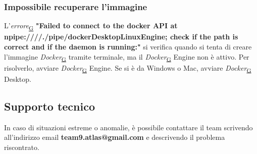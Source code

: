 \documentclass[a4paper,12pt]{article}
\begin{document}
      \subsubsection{Impossibile recuperare l'immagine}
      L'\textit{errore}\textsubscript{\href{https://atlasteam9.github.io/Atlas/glossario.html\#Errore}{G}} \textbf{"Failed to connect to the docker API at npipe:\newline////./pipe/dockerDesktopLinuxEngine; check if the path is correct and if the \newline daemon is running:"} si verifica quando si tenta di creare l'immagine \textit{Docker}\textsubscript{\href{https://atlasteam9.github.io/Atlas/glossario.html\#Docker}{G}} tramite terminale, ma il \textit{Docker}\textsubscript{\href{https://atlasteam9.github.io/Atlas/glossario.html\#Docker}{G}} Engine non è attivo. Per risolverlo, avviare \textit{Docker}\textsubscript{\href{https://atlasteam9.github.io/Atlas/glossario.html\#Docker}{G}} Engine. Se si è da Windows o Mac, avviare \textit{Docker}\textsubscript{\href{https://atlasteam9.github.io/Atlas/glossario.html\#Docker}{G}} Desktop.
      \subsection{Supporto tecnico}
      In caso di situazioni estreme o anomalie, è possibile contattare il team scrivendo all'indirizzo email  \textbf{team9.atlas@gmail.com} e descrivendo il problema riscontrato.
\end{document}
